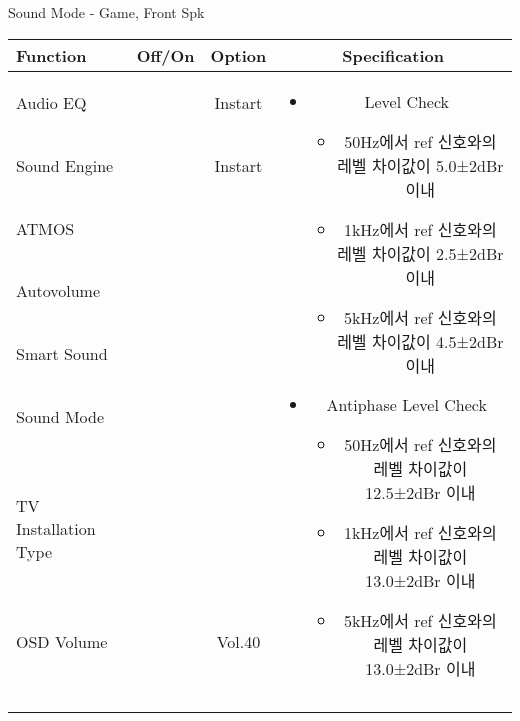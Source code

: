\begin{frame}[t]{Sound Mode - Game, Front Spk}
\begin{tiny}
\begin{tabular}{@{}lccc@{}}
\toprule
Function & Off/On & Option & Specification \\
\midrule
Audio EQ & \color{black}{Off} & Instart &
\multirow{10}{60mm}{
\begin{itemize}
    \item Level Check
    \begin{itemize}
        \item 50Hz에서 ref 신호와의 레벨 차이값이 5.0±2dBr 이내
        \item 1kHz에서 ref 신호와의 레벨 차이값이 2.5±2dBr 이내
        \item 5kHz에서 ref 신호와의 레벨 차이값이 4.5±2dBr 이내
    \end{itemize}
    \item Antiphase Level Check
    \begin{itemize}
        \item 50Hz에서 ref 신호와의 레벨 차이값이 12.5±2dBr 이내
        \item 1kHz에서 ref 신호와의 레벨 차이값이 13.0±2dBr 이내
        \item 5kHz에서 ref 신호와의 레벨 차이값이 13.0±2dBr 이내
    \end{itemize}
\end{itemize}
} \\
Sound Engine & \color{blue}{On} & Instart & \\
ATMOS & \color{black}{Off}  & & \\
Autovolume & \color{black}{Off} & & \\
Smart Sound & \color{black}{Off} & & \\
Sound Mode & \color{blue}{On} & \color{blue}{Game} & \\
TV Installation Type & \color{blue}{On} & \color{black}{Standtype1} & \\
OSD Volume & \color{blue}{On} & Vol.40 & \\
& & & \\
& & & \\
& & & \\
& & & \\
\midrule
\end{tabular}
\end{tiny}

\end{frame}



